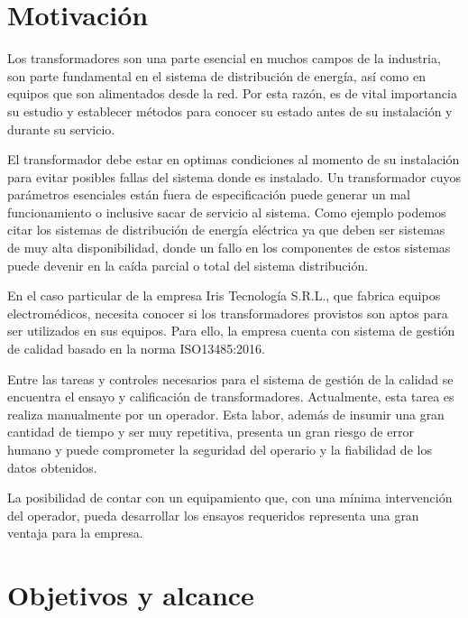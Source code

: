 
\section{Motivación}
Los transformadores son una parte esencial en muchos campos de la industria, son parte fundamental en el sistema de distribución de energía, así como en equipos que son alimentados desde la red. Por esta razón, es de vital importancia su estudio y establecer métodos para conocer su estado antes de su instalación y durante su servicio.

El transformador debe estar en optimas condiciones al momento de su instalación para evitar posibles fallas del sistema donde es instalado. Un transformador cuyos parámetros esenciales están fuera de especificación puede generar un mal funcionamiento o inclusive sacar de servicio al sistema. Como ejemplo podemos citar los sistemas de distribución de energía eléctrica ya que deben ser sistemas de muy alta disponibilidad, donde un fallo en los componentes de estos sistemas puede devenir en la caída parcial o total del sistema distribución.

En el caso particular de la empresa Iris Tecnología S.R.L., que fabrica equipos electromédicos, necesita conocer si los transformadores provistos son aptos para ser utilizados en sus equipos. Para ello, la empresa cuenta con sistema de gestión de calidad basado en la norma ISO13485:2016.

Entre las tareas y controles necesarios para el sistema de gestión de la calidad se encuentra el ensayo y calificación de transformadores. Actualmente, esta tarea es realiza manualmente por un operador. Esta labor, además de insumir una gran cantidad de tiempo y ser muy repetitiva, presenta un gran riesgo de error humano y puede comprometer la seguridad del operario y la fiabilidad de los datos obtenidos.

La posibilidad de contar con un equipamiento que, con una mínima intervención del operador, pueda desarrollar los ensayos requeridos representa una gran ventaja para la empresa.


\section{Objetivos y alcance}

